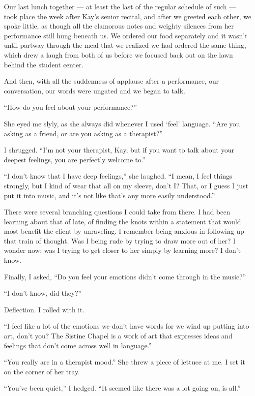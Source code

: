 Our last lunch together --- at least the last of the regular schedule of such --- took place the week after Kay's senior recital, and after we greeted each other, we spoke little, as though all the clamorous notes and weighty silences from her performance still hung beneath us. We ordered our food separately and it wasn't until partway through the meal that we realized we had ordered the same thing, which drew a laugh from both of us before we focused back out on the lawn behind the student center.

And then, with all the suddenness of applause after a performance, our conversation, our words were ungated and we began to talk.

``How do you feel about your performance?''

She eyed me slyly, as she always did whenever I used `feel' language. ``Are you asking as a friend, or are you asking as a therapist?''

I shrugged. ``I'm not your therapist, Kay, but if you want to talk about your deepest feelings, you are perfectly welcome to.''

``I don't know that I have deep feelings,'' she laughed. ``I mean, I feel things strongly, but I kind of wear that all on my sleeve, don't I? That, or I guess I just put it into music, and it's not like that's any more easily understood.''

There were several branching questions I could take from there. I had been learning about that of late, of finding the knots within a statement that would most benefit the client by unraveling. I remember being anxious in following up that train of thought. Was I being rude by trying to draw more out of her? I wonder now: was I trying to get closer to her simply by learning more? I don't know.

Finally, I asked, ``Do you feel your emotions didn't come through in the music?''

``I don't know, did they?''

Deflection. I rolled with it.

``I feel like a lot of the emotions we don't have words for we wind up putting into art, don't you? The Sistine Chapel is a work of art that expresses ideas and feelings that don't come across well in language.''

``You really are in a therapist mood.'' She threw a piece of lettuce at me. I set it on the corner of her tray.

``You've been quiet,'' I hedged. ``It seemed like there was a lot going on, is all.''

